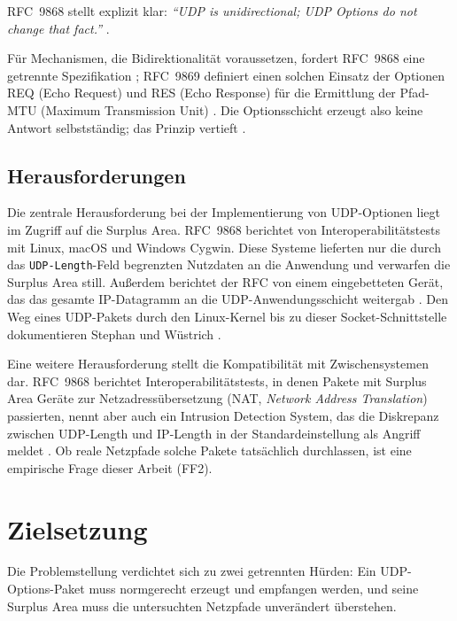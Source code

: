 RFC~9868 stellt explizit klar: \emph{\enquote{UDP is unidirectional; UDP Options do not change that fact.}}
\cite[Sec.~6]{rfc9868}.

Für Mechanismen, die Bidirektionalität voraussetzen, fordert RFC~9868 eine getrennte Spezifikation
\cite[Sec.~6]{rfc9868}; RFC~9869 definiert einen solchen Einsatz der Optionen REQ (Echo Request) und RES (Echo Response)
für die Ermittlung der Pfad-MTU (Maximum Transmission Unit) \cite[Sec.~3]{rfc9869}. Die Optionsschicht erzeugt also
keine Antwort selbstständig; das Prinzip vertieft .

\subsection{Herausforderungen}

Die zentrale Herausforderung bei der Implementierung von UDP-Optionen liegt im Zugriff auf die Surplus Area.
RFC~9868 berichtet von Interoperabilitätstests mit Linux, macOS und Windows Cygwin. Diese Systeme lieferten
nur die durch das \texttt{UDP-Length}-Feld begrenzten Nutzdaten an die Anwendung und verwarfen die Surplus
Area still. Außerdem berichtet der RFC von einem eingebetteten Gerät, das das gesamte IP-Datagramm an die
UDP-Anwendungsschicht weitergab
\cite[Sec.~18]{rfc9868}. Den Weg eines UDP-Pakets durch den Linux-Kernel bis zu dieser Socket-Schnittstelle
dokumentieren Stephan und Wüstrich \cite{stephan2024packetpath}.

Eine weitere Herausforderung stellt die Kompatibilität mit Zwischensystemen dar. RFC~9868 berichtet
Interoperabilitätstests, in denen Pakete mit Surplus Area Geräte zur Netzadressübersetzung (NAT,
\textit{Network Address Translation}) passierten, nennt aber auch ein Intrusion Detection System, das die
Diskrepanz zwischen UDP-Length und IP-Length in der Standardeinstellung als Angriff meldet
\cite[Sec.~18]{rfc9868}. Ob reale Netzpfade solche Pakete tatsächlich durchlassen, ist eine empirische Frage
dieser Arbeit (FF2).

\section{Zielsetzung}
\label{sec:zielsetzung}

Die Problemstellung verdichtet sich zu zwei getrennten Hürden: Ein UDP-Options-Paket muss normgerecht erzeugt und
empfangen werden, und seine Surplus Area muss die untersuchten Netzpfade unverändert überstehen.

